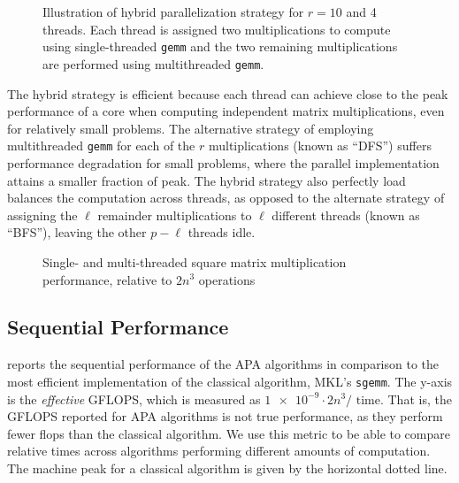 \documentclass[conference]{IEEEtran}
\newcommand{\datafile}{}
\newcommand{\threads}{}
\begin{document}
\begin{figure}
\centering

\caption{Illustration of hybrid parallelization strategy for $r=10$ and 4 threads.  Each thread is assigned two multiplications to compute using single-threaded \texttt{gemm} and the two remaining multiplications are performed using multithreaded \texttt{gemm}.}
\label{fig:hybrid}
\end{figure}

The hybrid strategy is efficient because each thread can achieve close to the peak performance of a core when computing independent matrix multiplications, even for relatively small problems.
The alternative strategy of employing multithreaded \texttt{gemm} for each of the $r$ multiplications (known as ``DFS'') suffers performance degradation for small problems, where the parallel implementation attains a smaller fraction of peak.
The hybrid strategy also perfectly load balances the computation across threads, as opposed to the alternate strategy of assigning the $\ell$ remainder multiplications to $\ell$ different threads (known as ``BFS''), leaving the other $p-\ell$ threads idle.

\begin{figure*}[t!]
%
\subfloat[One thread]{
\centering
\renewcommand{\datafile}{data/matmul_seq.dat}
\renewcommand{\threads}{1}

\label{fig:matmul_seq}}
%
\hfill
\subfloat[Six threads]{
\centering
\renewcommand{\datafile}{data/matmul_par_6.dat}
\renewcommand{\threads}{6}

\label{fig:matmul_par_6}}
%
\hfill
\subfloat[Twelve threads]{
\centering
\renewcommand{\datafile}{data/matmul_par_12.dat}
\renewcommand{\threads}{12}

\label{fig:matmul_par_12}}
%
\caption{Single- and multi-threaded square matrix multiplication performance, relative to $2n^3$ operations}
\label{fig:matmul_perf}
\end{figure*}

\subsection{Sequential Performance}

 reports the sequential performance of the APA algorithms in comparison to the most efficient implementation of the classical algorithm, MKL's \texttt{sgemm}.
The y-axis is the \emph{effective} GFLOPS, which is measured as $\num{1e-9} \cdot 2n^3 / \text{ time}$.
That is, the GFLOPS reported for APA algorithms is not true performance, as they perform fewer flops than the classical algorithm.
We use this metric to be able to compare relative times across algorithms performing different amounts of computation.
The machine peak for a classical algorithm is given by the horizontal dotted line.
\end{document}
